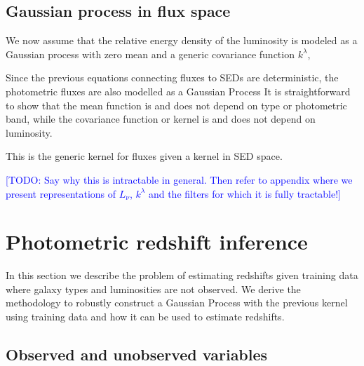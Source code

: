 \documentclass[aps,prd,showpacs,superscriptaddress,groupedaddress]{revtex4}  %
\newcommand{\todo}[1]{\textcolor{blue}{[TODO: #1]}}
\begin{document}
\subsection{Gaussian process in flux space}

We now assume that the relative energy density of the luminosity is modeled as a Gaussian process with zero mean and a generic covariance function $k^\lambda$,
	
Since the previous equations connecting fluxes to SEDs are deterministic, the photometric fluxes are also modelled as a Gaussian Process 
It is straightforward to show that the mean function is
and does not depend on type or photometric band, while the covariance function or kernel is
and does not depend on luminosity.

This is the generic kernel for fluxes given a kernel in SED space.

\todo{Say why this is intractable in general. Then refer to appendix where we present representations of $L_\nu$, $k^\lambda$ and the filters for which it is fully tractable!}



\section{Photometric redshift inference}

In this section we describe the problem of estimating redshifts given training data where galaxy types and luminosities are not observed.
We derive the methodology to robustly construct a Gaussian Process with the previous kernel using training data and how it can be used to estimate redshifts.

\subsection{Observed and unobserved variables}
\end{document}
